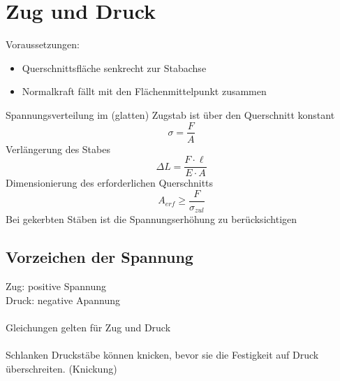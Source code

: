 



\section{Zug und Druck}
Voraussetzungen: 
\begin{itemize}
  \item Querschnittsfläche senkrecht zur Stabachse
  \item Normalkraft fällt mit den Flächenmittelpunkt zusammen
\end{itemize}
Spannungsverteilung im (glatten) Zugstab ist über den Querschnitt konstant
\[ \sigma = \frac{F}{A} \]
Verlängerung des Stabes
\[ \Delta L = \frac{F \cdot \ell}{E \cdot A} \]
Dimensionierung des erforderlichen Querschnitts
\[ A_{erf} \geq \frac{F}{\sigma_{zul}} \]
Bei gekerbten Stäben ist die Spannungserhöhung zu berücksichtigen

\subsection{Vorzeichen der Spannung}
Zug: positive Spannung\\
Druck: negative Apannung\\\\
Gleichungen gelten für Zug und Druck\\\\
Schlanken Druckstäbe können knicken, bevor sie die Festigkeit auf Druck überschreiten. (Knickung)

